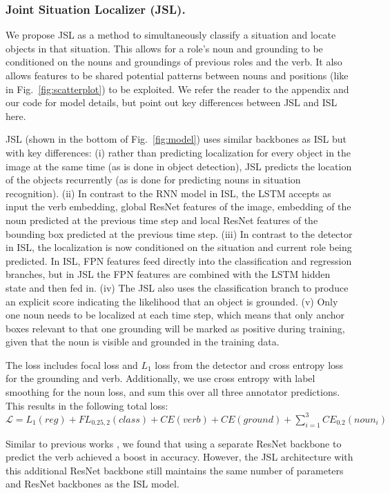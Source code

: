 \documentclass[runningheads]{llncs}
\begin{document}
\vspace{-5mm}
\subsubsection{Joint Situation Localizer (JSL). }
We propose JSL as a method to simultaneously classify a situation and locate objects in that situation. This allows for a role's noun and grounding to be conditioned on the nouns and groundings of previous roles and the verb. It also allows features to be shared potential patterns between nouns and positions (like in Fig.~\ref{fig:scatterplot}) to be exploited. We refer the reader to the appendix and our code for model details, but point out key differences between JSL and ISL here. 

JSL (shown in the bottom of Fig.~\ref{fig:model}) uses similar backbones as ISL but with key differences: (i) rather than predicting localization for every object in the image at the same time (as is done in object detection), JSL predicts the location of the objects recurrently (as is done for predicting nouns in situation recognition). (ii) In contrast to the RNN model in ISL, the LSTM accepts as input the verb embedding, global ResNet features of the image, embedding of the noun predicted at the previous time step and local ResNet features of the bounding box predicted at the previous time step. (iii) In contrast to the detector in ISL, the localization is now conditioned on the situation and current role being predicted. In ISL, FPN features feed directly into the classification and regression branches, but in JSL the FPN features are combined with the LSTM hidden state and then fed in. (iv) The JSL also uses the classification branch to produce an explicit score indicating the likelihood that an object is grounded. (v) Only one noun needs to be localized at each time step, which means that only anchor boxes relevant to that one grounding will be marked as positive during training, given that the noun is visible and grounded in the training data. 


The loss includes focal loss and $L_1$ loss from the detector and cross entropy loss for the grounding and verb. Additionally, we use cross entropy with label smoothing for the noun loss, and sum this over all three annotator predictions. This results in the following total loss:
$\mathcal{L} = L_1(reg) + FL_{0.25,2}(class) + CE(verb) + CE(ground) + \sum_{i=1}^{3} CE_{0.2}({noun_i})$

Similar to previous works \cite{imsiturnn,suhail2019mixture}, we found that using a separate ResNet backbone to predict the verb achieved a boost in accuracy. However, the JSL architecture with this additional ResNet backbone still maintains the same number of parameters and ResNet backbones as the ISL model.
\end{document}
